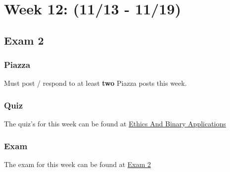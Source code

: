 \clearpage
\chapter{Week 12: (11/13 - 11/19)}

\section{Exam 2}

\subsection{Piazza}

Must post / respond to at least \textbf{two} Piazza posts this week.  

\subsection{Quiz}

The quiz's for this week can be found at \href{https://applied.cs.colorado.edu/mod/quiz/view.php?id=51821}{Ethics And Binary Applications}  

\subsection{Exam}

The exam for this week can be found at \href{https://applied.cs.colorado.edu/mod/quiz/view.php?id=51823}{Exam 2}  